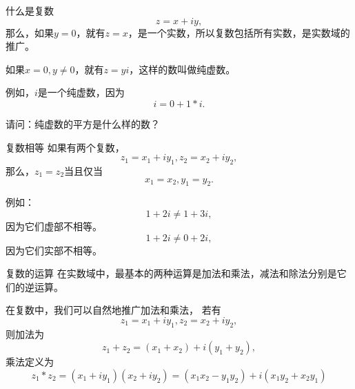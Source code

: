 \documentclass[11pt]{beamer}
\newcommand{\kong}[1][0.5]{\vspace{#1cm}}
\begin{document}
\begin{frame}{什么是复数}
\begin{equation}
z = x + i y,
\end{equation}
那么，如果$y=0$，就有$z=x$，是一个实数，所以复数包括所有实数，是实数域的推广。

\kong

如果$x=0,y\neq 0$，就有$z= yi$，这样的数叫做纯虚数。

\kong[0.5]

例如，$i$是一个纯虚数，因为
\begin{equation}
i = 0 + 1*i.
\end{equation}

\kong

请问：纯虚数的平方是什么样的数？

\end{frame}

\begin{frame}{复数相等}
如果有两个复数，
\begin{equation}
z_1 = x_1 + i y_1, z_2 = x_2 + i y_2,
\end{equation}
那么，$z_1 = z_2$当且仅当
\begin{equation}
x_1 = x_2, y_1 = y_2.
\end{equation}

例如：
\begin{equation}
1 + 2i \neq 1 + 3i,
\end{equation}
因为它们虚部不相等。
\begin{equation}
1 + 2i \neq 0 + 2i,
\end{equation}
因为它们实部不相等。
\end{frame}

\begin{frame}{复数的运算}
在实数域中，最基本的两种运算是加法和乘法，减法和除法分别是它们的逆运算。

\kong

在复数中，我们可以自然地推广加法和乘法，
若有
\begin{equation}
z_1 = x_1 + iy_1, z_2 = x_2 + i y_2,
\end{equation}
则加法为
\begin{equation}
z_1 + z_2 = (x_1 + x_2) + i(y_1 + y_2),
\end{equation}
乘法定义为
\begin{equation}
z_1 * z_2 = (x_1 + iy_1)(x_2 + iy_2) = (x_1 x_2 - y_1 y_2) + i(x_1 y_2 + x_2 y_1)
\end{equation}

\end{frame}
\end{document}
